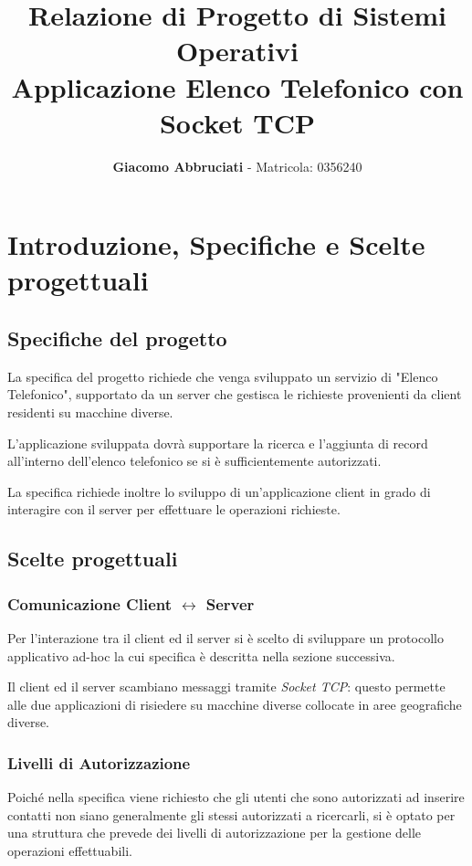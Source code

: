 \documentclass[11pt, a4paper]{article}
\title{\textbf{\Large Relazione di Progetto di Sistemi Operativi}\\ \huge Applicazione Elenco Telefonico con Socket TCP}
\author{\textbf{Giacomo Abbruciati} - Matricola: 0356240}
\date{}
\begin{document}
	
	\maketitle
	
	\tableofcontents
	\newpage
	
	\section{Introduzione, Specifiche e Scelte progettuali}

	\subsection{Specifiche del progetto}
	La specifica del progetto richiede che venga sviluppato un servizio di "Elenco Telefonico", supportato da un server che gestisca le richieste provenienti da client residenti su macchine diverse.
	
	L'applicazione sviluppata dovrà supportare la ricerca e l'aggiunta di record all'interno dell'elenco telefonico se si è sufficientemente autorizzati.
	
	La specifica richiede inoltre lo sviluppo di un'applicazione client in grado di interagire con il server per effettuare le operazioni richieste.
	
	\subsection{Scelte progettuali}
	
	\subsubsection{Comunicazione Client $\longleftrightarrow$ Server}
	
	Per l'interazione tra il client ed il server si è scelto di sviluppare un protocollo applicativo ad-hoc la cui specifica è descritta nella sezione successiva.
	
	Il client ed il server scambiano messaggi tramite \textit{Socket TCP}: questo permette alle due applicazioni di risiedere su macchine diverse collocate in aree geografiche diverse.
	
	\subsubsection{Livelli di Autorizzazione}
	
	Poiché nella specifica viene richiesto che gli utenti che sono autorizzati ad inserire contatti non siano generalmente gli stessi autorizzati a ricercarli, si è optato per una struttura che prevede dei livelli di autorizzazione per la gestione delle operazioni effettuabili.
	
\end{document}

